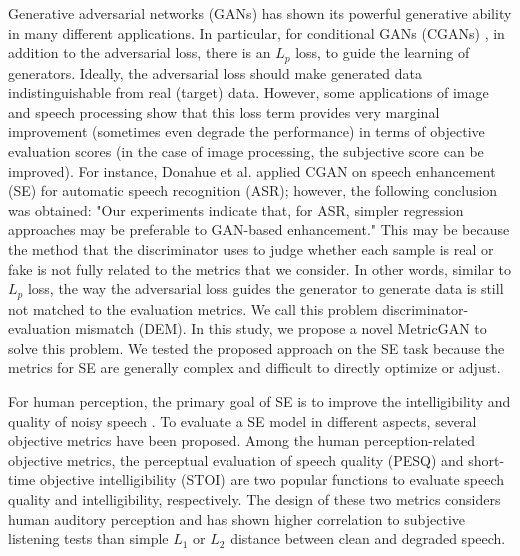 \documentclass{article}
\begin{document}
Generative adversarial networks (GANs) \cite{goodfellow2014generative} has shown its powerful generative ability in many different applications. In particular, for conditional GANs (CGANs)  \cite{mirza2014conditional}, in addition to the adversarial loss, there is an $L_{p}$ loss, to guide the learning of generators. Ideally, the adversarial loss should make generated data indistinguishable from real (target) data. However, some applications of image \cite{ledig2017photo,wang2018esrgan} and speech processing \cite{pandey2018adversarial,wang2018supervised,donahue2018exploring, michelsanti2017conditional} show that this loss term provides very marginal improvement (sometimes even degrade the performance) in terms of objective evaluation scores (in the case of image processing, the subjective score can be improved). For instance, Donahue et al.  applied CGAN on speech enhancement (SE) for automatic speech recognition (ASR); however, the following conclusion was obtained: "Our experiments indicate that, 
for ASR, simpler regression approaches may be preferable
to GAN-based enhancement." This may be because the method that the discriminator uses to judge whether each sample is real or fake is not fully related to the metrics that we consider. In other words, similar to  $L_{p}$ loss, the way the adversarial loss guides the generator to generate data is still not matched to the evaluation metrics. We call this problem discriminator-evaluation mismatch (DEM). In this study, we propose a novel MetricGAN to solve this problem. We tested the proposed approach on the SE task because the metrics for SE are generally complex and difficult to directly optimize or adjust.


For human perception, the primary goal of SE is to improve the intelligibility and quality of noisy speech \cite{benesty2015speech}. To evaluate a SE model in different aspects, several objective metrics have been proposed. Among the human perception-related objective metrics, the perceptual evaluation of speech quality (PESQ) \cite{rix2001perceptual} and short-time objective intelligibility (STOI) \cite{taal2011algorithm} are two popular functions to evaluate speech quality and intelligibility, respectively. The design of these two metrics considers human auditory perception and has shown higher correlation to subjective listening tests than simple $L_{1}$ or $L_{2}$ distance between clean and degraded speech. 
\end{document}
